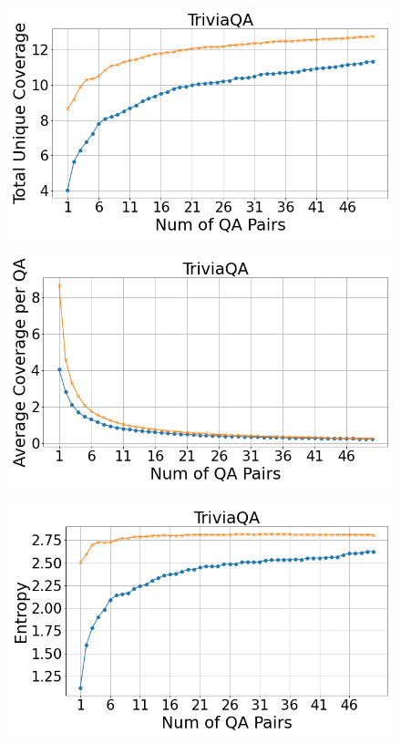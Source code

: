 \documentclass[11pt]{article}
\begin{document}
\begin{figure}[h!]
    \begin{minipage}[h]{0.33\linewidth}
        \centering
        \includegraphics[width=\textwidth]{submissions/Tung2023/figs/TriviaQA_Total Unique Coverage.png}
    \label{fig:triviaqa-total-unique-coverage}
    \end{minipage}
    \begin{minipage}[h]{0.33\linewidth}
        \centering
        \includegraphics[width=\textwidth]{submissions/Tung2023/figs/TriviaQA_Average Coverage per QA.png}
    \label{fig:triviaqa-avg-cov-per-qa}
    \end{minipage}
    \begin{minipage}[h]{0.33\linewidth}
        \centering
        \includegraphics[width=\textwidth]{submissions/Tung2023/figs/TriviaQA_Entropy.png}

\end{minipage}
\end{figure}
\end{document}
